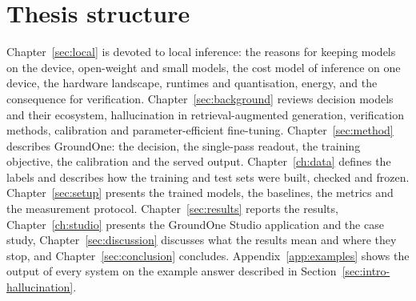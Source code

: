 \section{Thesis structure}
\label{sec:intro-structure}

Chapter~\ref{sec:local} is devoted to local inference: the reasons for keeping models on the device, open-weight and
small models, the cost model of inference on one device, the hardware landscape, runtimes and quantisation, energy, and
the consequence for verification. Chapter~\ref{sec:background} reviews decision models and their
ecosystem, hallucination in retrieval-augmented generation, verification methods, calibration and parameter-efficient fine-tuning. Chapter~\ref{sec:method} describes
GroundOne: the decision, the single-pass readout, the training objective, the calibration and the served output.
Chapter~\ref{ch:data} defines the labels and describes how the training and test sets were built, checked and frozen.
Chapter~\ref{sec:setup} presents the trained models, the baselines, the metrics and the measurement protocol.
Chapter~\ref{sec:results} reports the results, Chapter~\ref{ch:studio} presents the GroundOne Studio application and
the case study, Chapter~\ref{sec:discussion} discusses what the results mean and where they stop,
and Chapter~\ref{sec:conclusion} concludes. Appendix~\ref{app:examples} shows the output of every system on the example
answer described in Section~\ref{sec:intro-hallucination}.
